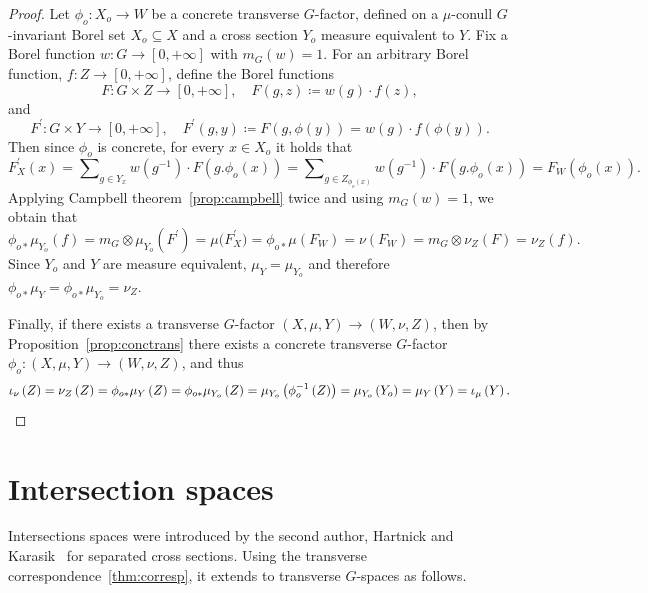 \documentclass{amsart}
\numberwithin{equation}{subsection}
\theoremstyle{remark}
\begin{document}
\begin{proof}
Let \(\phi_{o}:X_{o}\to W\) be a concrete transverse \(G\)-factor, defined on a \(\mu\)-conull \(G\)-invariant Borel set \(X_{o}\subseteq X\) and a cross section \(Y_{o}\) measure equivalent to \(Y\). Fix a Borel function \(w:G\to\left[0,+\infty\right]\) with \(m_{G}\left(w\right)=1\). For an arbitrary Borel function, \(f:Z\to\left[0,+\infty\right]\), define the Borel functions
\[F:G\times Z\longrightarrow\left[0,+\infty\right],\quad F\left(g,z\right)\coloneqq w\left(g\right)\cdot f\left(z\right),\]
and
\[F^{\prime}:G\times Y\to\left[0,+\infty\right],\quad F^{\prime}\left(g,y\right)\coloneqq F\left(g,\phi\left(y\right)\right)=w\left(g\right)\cdot f\left(\phi\left(y\right)\right).\]
Then since \(\phi_{o}\) is concrete, for every \(x\in X_{o}\) it holds that
\[F_{X}^{\prime}\left(x\right)=\sum\nolimits_{g\in Y_{x}}w\left(g^{-1}\right)\cdot F\left(g.\phi_{o}\left(x\right)\right)=\sum\nolimits_{g\in Z_{\phi_{o}\left(x\right)}}w\left(g^{-1}\right)\cdot F\left(g.\phi_{o}\left(x\right)\right)=F_{W}\left(\phi_{o}\left(x\right)\right).\]
Applying Campbell theorem~\ref{prop:campbell} twice and using \(m_{G}\left(w\right)=1\), we obtain that
\[\phi_{o\ast}\mu_{Y_{o}}\left(f\right)=m_{G}\otimes\mu_{Y_{o}}\left(F^{\prime}\right)=\mu\big(F_{X}^{\prime}\big)=\phi_{o\ast}\mu\left(F_{W}\right)=\nu\left(F_{W}\right)=m_{G}\otimes\nu_{Z}\left(F\right)=\nu_{Z}\left(f\right).\]
Since \(Y_{o}\) and \(Y\) are measure equivalent, \(\mu_{Y}=\mu_{Y_{o}}\) and therefore \(\phi_{o\ast}\mu_{Y}=\phi_{o\ast}\mu_{Y_{o}}=\nu_{Z}\).

Finally, if there exists a transverse \(G\)-factor \(\left(X,\mu,Y\right)\to \left(W,\nu,Z\right)\), then by Proposition~\ref{prop:conctrans} there exists a concrete transverse \(G\)-factor \(\phi_{o}:\left(X,\mu,Y\right)\to\left(W,\nu,Z\right)\), and thus
\[\iota_{\nu}\left(Z\right)	=\nu_{Z}\left(Z\right)=\phi_{o\ast}\mu_{Y}\left(Z\right)=\phi_{o\ast}\mu_{Y_{o}}\left(Z\right)=\mu_{Y_{o}}\left(\phi_{o}^{-1}\left(Z\right)\right)=\mu_{Y_{o}}\left(Y_{o}\right)=\mu_{Y}\left(Y\right)=\iota_{\mu}\left(Y\right).\qedhere\]
\end{proof}

\section{Intersection spaces}\label{sct:intsp}

Intersections spaces were introduced by the second author, Hartnick and Karasik~\cite{bjorklund2025int} for separated cross sections. Using the transverse correspondence~\ref{thm:corresp}, it extends to transverse \(G\)-spaces as follows.
\end{document}
